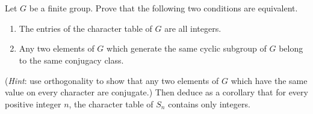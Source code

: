\documentclass[12pt]{article}
\begin{document}
\section{}
Let $G$ be a finite group. Prove that the following two conditions are equivalent.
\begin{enumerate}
    \item The entries of the character table of $G$ are all integers.
    \item Any two elements of $G$ which generate the same cyclic subgroup of $G$ belong
    to the same conjugacy class.
\end{enumerate}
(\textit{Hint}: use orthogonality to show that any two elements of $G$ which have the
same value on every character are conjugate.)
Then deduce as a corollary that for every positive integer $n$, the character table of
$S_n$ contains only integers.
\end{document}
